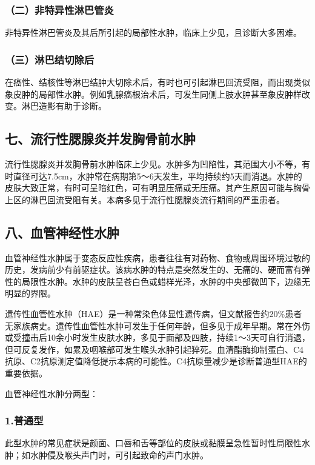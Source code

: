 \subsubsection{（二）非特异性淋巴管炎}

非特异性淋巴管炎及其后所引起的局部性水肿，临床上少见，且诊断大多困难。

\subsubsection{（三）淋巴结切除后}

在癌性、结核性等淋巴结肿大切除术后，有时也可引起淋巴回流受阻，而出现类似象皮肿的局部性水肿。例如乳腺癌根治术后，可发生同侧上肢水肿甚至象皮肿样改变。淋巴造影有助于诊断。

\subsection{七、流行性腮腺炎并发胸骨前水肿}

流行性腮腺炎并发胸骨前水肿临床上少见。水肿多为凹陷性，其范围大小不等，有时直径可达7.5cm，水肿常在病期第5～6天发生，平均持续约5天而消退。水肿的皮肤大致正常，有时可呈暗红色，可有明显压痛或无压痛。其产生原因可能与胸骨上区的淋巴回流受阻有关。本病多见于流行性腮腺炎流行期间的严重患者。

\subsection{八、血管神经性水肿}

血管神经性水肿属于变态反应性疾病，患者往往有对药物、食物或周围环境过敏的历史，发病前少有前驱症状。该病水肿的特点是突然发生的、无痛的、硬而富有弹性的局限性水肿。水肿的皮肤呈苍白色或蜡样光泽，水肿的中央部微凹下，边缘无明显的界限。

遗传性血管性水肿（HAE）是一种常染色体显性遗传病，但文献报告约20\%患者无家族病史。遗传性血管性水肿可发生于任何年龄，但多见于成年早期。常在外伤或受撞击后10余小时发生皮肤水肿，多见于面部及四肢，持续1～3天可自行消退，但可反复发作，如累及咽喉部可发生喉头水肿引起猝死。血清酯酶抑制蛋白、C4抗原、C2抗原测定值降低提示本病的可能性。C4抗原量减少是诊断普通型HAE的重要依据。

血管神经性水肿分两型：

\subsubsection{1.普通型}

此型水肿的常见症状是颜面、口唇和舌等部位的皮肤或黏膜呈急性暂时性局限性水肿；如水肿侵及喉头声门时，可引起致命的声门水肿。

